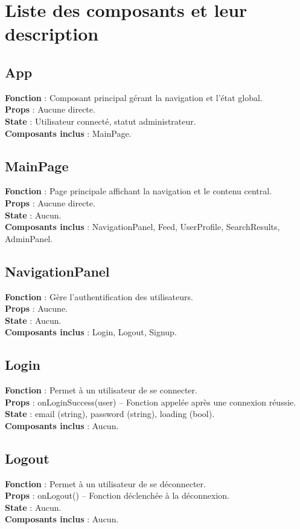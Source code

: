 \documentclass{article}
\begin{document}
\section*{Liste des composants et leur description}

\subsection*{App}
\textbf{Fonction} : Composant principal gérant la navigation et l'état global.\\
\textbf{Props} : Aucune directe.\\
\textbf{State} : Utilisateur connecté, statut administrateur.\\
\textbf{Composants inclus} : MainPage.

\subsection*{MainPage}
\textbf{Fonction} : Page principale affichant la navigation et le contenu central.\\
\textbf{Props} : Aucune directe.\\
\textbf{State} : Aucun.\\
\textbf{Composants inclus} : NavigationPanel, Feed, UserProfile, SearchResults, AdminPanel.

\subsection*{NavigationPanel}
\textbf{Fonction} : Gère l'authentification des utilisateurs.\\
\textbf{Props} : Aucune.\\
\textbf{State} : Aucun.\\
\textbf{Composants inclus} : Login, Logout, Signup.

\subsection*{Login}
\textbf{Fonction} : Permet à un utilisateur de se connecter.\\
\textbf{Props} : onLoginSuccess(user) – Fonction appelée après une connexion réussie.\\
\textbf{State} : email (string), password (string), loading (bool).\\
\textbf{Composants inclus} : Aucun.

\subsection*{Logout}
\textbf{Fonction} : Permet à un utilisateur de se déconnecter.\\
\textbf{Props} : onLogout() – Fonction déclenchée à la déconnexion.\\
\textbf{State} : Aucun.\\
\textbf{Composants inclus} : Aucun.
\end{document}
